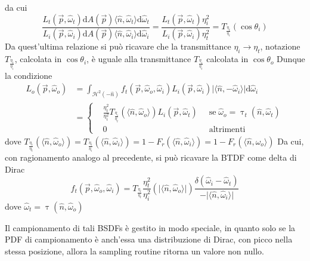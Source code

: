 da cui
\begin{equation}
	\frac{L_t(\vec{p},\hat{\omega}_t)\mathrm{d}A(\vec{p})\langle\hat{n},\hat{\omega}_t\rangle\mathrm{d}\hat{\omega}_t}%
	{L_i(\vec{p},\hat{\omega}_i)\mathrm{d}A(\vec{p})\langle\hat{n},\hat{\omega}_i\rangle\mathrm{d}\hat{\omega}_i} = %
	\frac{L_t(\vec{p},\hat{\omega}_t)\eta^2_i}{L_i(\vec{p},\hat{\omega}_i)\eta^2_t} = T_{\frac{\eta_t}{\eta_i}}(\cos\theta_i)
\end{equation}
Da quest'ultima relazione si pu\`o ricavare che la transmittance $\eta_i\rightarrow\eta_t$, notazione $T_{\frac{\eta_t}{\eta_i}}$, calcolata in 
$\cos\theta_i$\footnotemark{}, \`e uguale alla transmittance $T_{\frac{\eta_i}{\eta_t}}$ calcolata in $\cos\theta_o$
Dunque la condizione
\begin{align}
	L_o(\vec{p},\hat{\omega}_o)&=\int_{\mathcal{H}^2(-\hat{n})}f_t(\vec{p},\hat{\omega}_o,\hat{\omega}_i)%
		L_i(\vec{p},\hat{\omega}_i)\vert\langle\hat{n},-\hat{\omega}_i\rangle\vert\mathrm{d}\hat{\omega}_i%
		\\&=\left\{\begin{aligned}
			&\frac{\eta^2_t}{\eta_i^2}T_{\frac{\eta_i}{\eta_t}}(\langle\hat{n},\hat{\omega}_o\rangle)L_i(\vec{p},\hat{\omega}_t)%
				\;\;&\mathrm{se}\;\hat{\omega}_o=\uptau_t(\hat{n},\hat{\omega}_t)\\
			&0 &\mathrm{altrimenti}
		\end{aligned}\right.
\end{align}
dove $T_{\frac{\eta_i}{\eta_t}}(\langle\hat{n},\hat{\omega}_o\rangle)=T_{\frac{\eta_t}{\eta_i}}(\langle\hat{n},\hat{\omega}_i\rangle)%
	= 1 - F_r(\langle\hat{n},\hat{\omega}_i\rangle) = 1 - F_r(\langle\hat{n},\hat{\omega}_o\rangle)$
Da cui, con ragionamento analogo al precedente, si pu\`o ricavare la BTDF come delta di Dirac
\begin{equation}
	f_t(\vec{p},\hat{\omega}_o,\hat{\omega}_i)=T_{\frac{\eta_i}{\eta_t}}\frac{\eta_t^2}{\eta_i^2}(\vert\langle\hat{n},\hat{\omega}_o\rangle\vert)%
		\frac{\delta(\hat{\omega}_i-\hat{\omega}_t)}{-\vert\langle\hat{n},\hat{\omega}_i\rangle\vert}
\end{equation}
dove $\hat{\omega}_t=\uptau(\hat{n},\hat{\omega}_o)$\par
Il campionamento di tali BSDFs \`e gestito in modo speciale, in quanto solo se la PDF di campionamento \`e anch'essa una distribuzione di Dirac, 
con picco nella stessa posizione, allora la sampling routine ritorna un valore non nullo.
